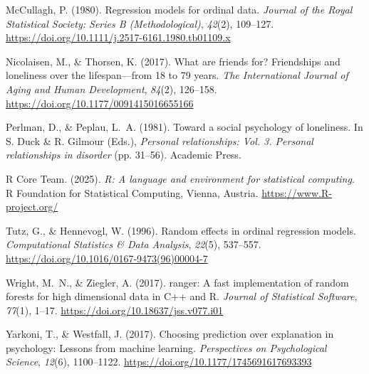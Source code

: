 \documentclass[12pt]{article}
\begin{document}
McCullagh, P. (1980). Regression models for ordinal data. \emph{Journal of the Royal
Statistical Society: Series B (Methodological)}, \emph{42}(2), 109--127.
\url{https://doi.org/10.1111/j.2517-6161.1980.tb01109.x}

Nicolaisen, M., \& Thorsen, K. (2017). What are friends for? Friendships and loneliness
over the lifespan---from 18 to 79 years. \emph{The International Journal of Aging and
Human Development}, \emph{84}(2), 126--158.
\url{https://doi.org/10.1177/0091415016655166}

Perlman, D., \& Peplau, L.~A. (1981). Toward a social psychology of loneliness. In
S. Duck \& R. Gilmour (Eds.), \emph{Personal relationships: Vol. 3. Personal
relationships in disorder} (pp. 31--56). Academic Press.

R Core Team. (2025). \emph{R: A language and environment for statistical computing}.
R Foundation for Statistical Computing, Vienna, Austria.
\url{https://www.R-project.org/}

Tutz, G., \& Hennevogl, W. (1996). Random effects in ordinal regression models.
\emph{Computational Statistics \& Data Analysis}, \emph{22}(5), 537--557.
\url{https://doi.org/10.1016/0167-9473(96)00004-7}

Wright, M.~N., \& Ziegler, A. (2017). ranger: A fast implementation of random forests for
high dimensional data in C++ and R. \emph{Journal of Statistical Software}, \emph{77}(1),
1--17. \url{https://doi.org/10.18637/jss.v077.i01}

Yarkoni, T., \& Westfall, J. (2017). Choosing prediction over explanation in psychology:
Lessons from machine learning. \emph{Perspectives on Psychological Science}, \emph{12}(6),
1100--1122. \url{https://doi.org/10.1177/1745691617693393}

\endgroup
\end{document}
